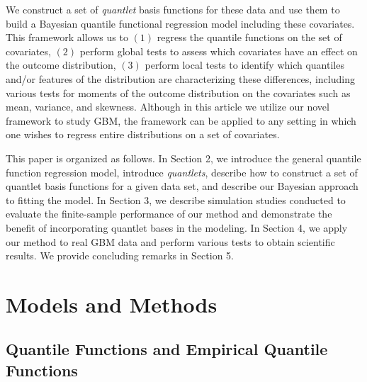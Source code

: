 \documentclass[11pt]{article}
\begin{document}
We construct a set of {\it quantlet} basis functions for these data and use them to build a Bayesian quantile functional regression model including these covariates. This framework allows us to $(1)$ regress the quantile functions on the set of covariates, $(2)$ perform global tests to assess which covariates have an effect on the outcome distribution,
$(3)$ perform  local tests to identify which quantiles and/or features of the distribution are characterizing these differences, including various tests for moments of the outcome distribution on the covariates such as  mean, variance, and skewness.
Although in this article we utilize our novel framework to study GBM,  the framework can be applied to any setting in which one wishes to regress entire distributions on a set of covariates.

This paper is organized as follows. In Section 2, we introduce the general quantile function regression model, introduce \textit{quantlets}, describe how to construct a set of quantlet basis functions for a given data set, and describe our Bayesian approach to fitting the model.  In Section 3, we describe simulation studies conducted to evaluate the finite-sample performance of our method and demonstrate the benefit of incorporating quantlet bases in the modeling. In Section 4, we apply our method to real GBM data and perform various tests to obtain scientific results. We provide concluding remarks in Section 5. 


\section{{\bf Models and Methods}}



\subsection{{\bf Quantile Functions and Empirical Quantile Functions}}  \label{sec:QF}
\end{document}
